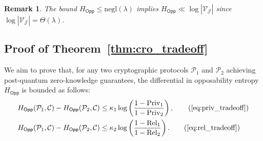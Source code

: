 \documentclass[preprint,12pt]{elsarticle}
\newtheorem{remark}{Remark}[section]
\newcommand{\negl}{\mathrm{negl}}
\begin{document}
                \begin{remark}
                    The bound $H_{\mathsf{Opp}} \leq \negl(\lambda)$ implies $H_{\mathsf{Opp}} \ll \log|\mathcal{V_J}|$ since $\log|\mathcal{V_J}| = \Theta(\lambda)$.
                \end{remark}

            \subsection{Proof of Theorem~\ref{thm:cro_tradeoff}}\label{app:A.5_cro_tradeoff_proof}

                We aim to prove that, for any two cryptographic protocols $\mathcal{P}_1$ and $\mathcal{P}_2$ achieving post-quantum zero-knowledge guarantees, the differential in opposability entropy $H_{\mathsf{Opp}}$ is bounded as follows:
                \begin{align}
                    H_{\mathsf{Opp}}(\mathcal{P}_1, \mathcal{C}) - H_{\mathsf{Opp}}(\mathcal{P}_2, \mathcal{C}) &\leq \kappa_1 \log\left(\frac{1 - \mathrm{Priv}_1}{1 - \mathrm{Priv}_2}\right), \tag{\ref{eq:priv_tradeoff}} \\
                    H_{\mathsf{Opp}}(\mathcal{P}_1, \mathcal{C}) - H_{\mathsf{Opp}}(\mathcal{P}_2, \mathcal{C}) &\leq \kappa_2 \log\left(\frac{1 - \mathrm{Rel}_1}{1 - \mathrm{Rel}_2}\right). \tag{\ref{eq:rel_tradeoff}}
                \end{align}
\end{document}
